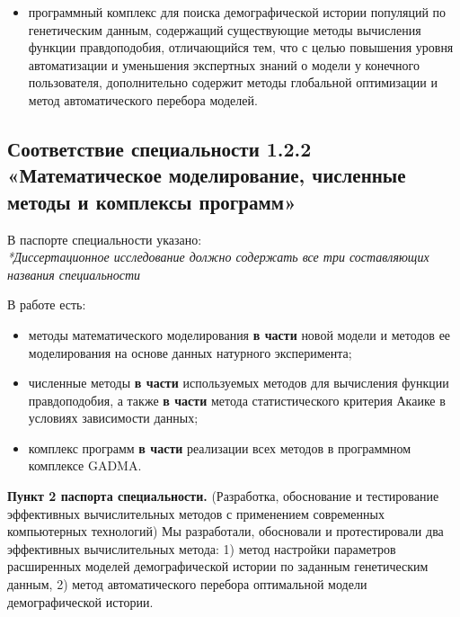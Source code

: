 \documentclass[a4paper,14pt,oneside,openany,article]{memoir}
\begin{document}
\begin{itemize}
\item программный комплекс для поиска демографической истории популяций по генетическим данным, содержащий существующие методы вычисления функции правдоподобия, отличающийся тем, что с целью повышения уровня автоматизации и уменьшения экспертных знаний о модели у конечного пользователя, дополнительно содержит методы глобальной оптимизации и метод автоматического перебора моделей.
\end{itemize}

\subsection*{Соответствие специальности 1.2.2 «Математическое моделирование, численные методы и комплексы программ»}

В паспорте специальности указано:\\
\textit{*Диссертационное исследование должно содержать все три составляющих названия специальности}

В работе есть:
\begin{itemize}
    \item методы математического моделирования \textbf{в части} новой модели и методов ее моделирования на основе данных натурного эксперимента;
    \item численные методы \textbf{в части} используемых методов для вычисления функции правдоподобия, а также \textbf{в части} метода статистического критерия Акаике в условиях зависимости данных;
    \item комплекс программ \textbf{в части} реализации всех методов в программном комплексе GADMA.
\end{itemize}


\textbf{Пункт 2 паспорта специальности.} (Разработка, обоснование и тестирование эффективных вычислительных методов с применением современных компьютерных технологий) 
Мы разработали, обосновали и протестировали два эффективных вычислительных метода: 1) метод настройки параметров расширенных моделей демографической истории по заданным генетическим данным, 2) метод автоматического перебора оптимальной модели демографической истории.
\end{document}

